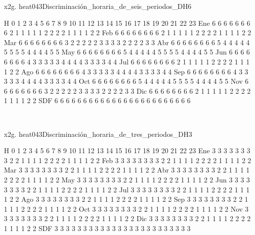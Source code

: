 \documentclass[a4paper,10pt]{article}
\begin{document}
\begin{Form}
x2g. heat043Discriminación_horaria_de_seis_periodos_DH6

H    0   1   2   3   4   5   6   7   8   9   10  11  12  13  14  15  16  17  18  19  20  21  22  23
Ene   6   6   6   6   6   6   6   6   2   1   1   1   1   1   2   2   2   2   1   1   1   1   2   2
Feb   6   6   6   6   6   6   6   6   2   1   1   1   1   1   2   2   2   2   1   1   1   1   2   2
Mar   6   6   6   6   6   6   6   6   3   2   2   2   2   2   3   3   3   3   2   2   2   2   3   3
Abr   6   6   6   6   6   6   6   6   5   4   4   4   4   4   5   5   5   5   4   4   4   4   5   5
May   6   6   6   6   6   6   6   6   5   4   4   4   4   4   5   5   5   5   4   4   4   4   5   5
Jun   6   6   6   6   6   6   6   6   4   3   3   3   3   3   4   4   4   4   3   3   3   3   4   4
Jul   6   6   6   6   6   6   6   6   2   1   1   1   1   1   2   2   2   2   1   1   1   1   2   2
Ago   6   6   6   6   6   6   6   6   4   3   3   3   3   3   4   4   4   4   3   3   3   3   4   4
Sep   6   6   6   6   6   6   6   6   4   3   3   3   3   3   4   4   4   4   3   3   3   3   4   4
Oct   6   6   6   6   6   6   6   6   5   4   4   4   4   4   5   5   5   5   4   4   4   4   5   5
Nov   6   6   6   6   6   6   6   6   3   2   2   2   2   2   3   3   3   3   2   2   2   2   3   3
Dic   6   6   6   6   6   6   6   6   2   1   1   1   1   1   2   2   2   2   1   1   1   1   2   2
SDF   6   6   6   6   6   6   6   6   6   6   6   6   6   6   6   6   6   6   6   6   6   6   6   6

\

x2g. heat043Discriminación_horaria_de_tres_periodos_DH3

H    0   1   2   3   4   5   6   7   8   9   10  11  12  13  14  15  16  17  18  19  20  21  22  23
Ene   3   3   3   3   3   3   3   3   2   2   1   1   1   1   2   2   2   2   1   1   1   1   2   2
Feb   3   3   3   3   3   3   3   3   2   2   1   1   1   1   2   2   2   2   1   1   1   1   2   2
Mar   3   3   3   3   3   3   3   3   2   2   1   1   1   1   2   2   2   2   1   1   1   1   2   2
Abr   3   3   3   3   3   3   3   3   2   2   1   1   1   1   2   2   2   2   1   1   1   1   2   2
May   3   3   3   3   3   3   3   3   2   2   1   1   1   1   2   2   2   2   1   1   1   1   2   2
Jun   3   3   3   3   3   3   3   3   2   2   1   1   1   1   2   2   2   2   1   1   1   1   2   2
Jul   3   3   3   3   3   3   3   3   2   2   1   1   1   1   2   2   2   2   1   1   1   1   2   2
Ago   3   3   3   3   3   3   3   3   2   2   1   1   1   1   2   2   2   2   1   1   1   1   2   2
Sep   3   3   3   3   3   3   3   3   2   2   1   1   1   1   2   2   2   2   1   1   1   1   2   2
Oct   3   3   3   3   3   3   3   3   2   2   1   1   1   1   2   2   2   2   1   1   1   1   2   2
Nov   3   3   3   3   3   3   3   3   2   2   1   1   1   1   2   2   2   2   1   1   1   1   2   2
Dic   3   3   3   3   3   3   3   3   2   2   1   1   1   1   2   2   2   2   1   1   1   1   2   2
SDF   3   3   3   3   3   3   3   3   3   3   3   3   3   3   3   3   3   3   3   3   3   3   3   3


\end{Form}
\end{document}
